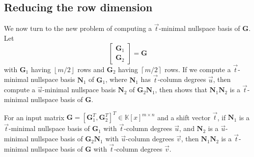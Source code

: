 \begin{comment}
Note the difference between \prettyref{lem:boundOfSumOfShiftedDegreesOfNullspaceBasis}
and \prettyref{lem:boundOnShiftedDegrees}. In \prettyref{lem:boundOfSumOfShiftedDegreesOfNullspaceBasis},
we consider only the shifted degree of a nullspace basis, where as
in \prettyref{lem:boundOnShiftedDegrees} applies to a order basis
but the order is subtracted from the degrees.
\end{comment}



\subsection{\label{sub:continueComputingNullspaceBasisByRows}Reducing the row
dimension }

We now turn to the new problem of computing a $\vec{t}$-minimal nullspace
basis of $\mathbf{G}$. Let 
\[
\left[\begin{array}{c}
\mathbf{G}_{1}\\
\mathbf{G}_{2}
\end{array}\right]=\mathbf{G}
\]
 with $\mathbf{G}_{1}$ having $\left\lfloor m/2\right\rfloor $ rows
and $\mathbf{G}_{2}$ having $\left\lceil m/2\right\rceil $ rows.
If we compute a $\vec{t}$-minimal nullspace basis $\mathbf{N}_{1}$
of $\mathbf{G}_{1}$, where $\mathbf{N}_{1}$ has $\vec{t}$-column
degrees $\vec{u}$, then compute a $\vec{u}$-minimal nullspace basis
$\mathbf{N}_{2}$ of $\mathbf{G}_{2}\mathbf{N}_{1}$, then 
shows that $\mathbf{N}_{1}\mathbf{N}_{2}$ is a $\vec{t}$-minimal
nullspace basis of $\mathbf{G}$. 
\begin{lem}
\label{lem:continueComputingNullspaceBasisByRows}For an input matrix
$\mathbf{G}=\left[\mathbf{G}_{1}^{T},\mathbf{G}_{2}^{T}\right]^{T}\in\mathbb{K}\left[x\right]^{m\times n}$
and a shift vector $\vec{t}$, if $\mathbf{N}_{1}$ is a $\vec{t}$-minimal
nullspace basis of $\mathbf{G}_{1}$ with $\vec{t}$-column degrees
$\vec{u}$, and $\mathbf{N}_{2}$ is a $\vec{u}$-minimal nullspace
basis of $\mathbf{G}_{2}\mathbf{N}_{1}$ with $\vec{u}$-column degrees
$\vec{v}$, then $\mathbf{N}_{1}\mathbf{N}_{2}$ is a $\vec{t}$-minimal
nullspace basis of $\mathbf{G}$ with $\vec{t}$-column degrees $\vec{v}$.\end{lem}

